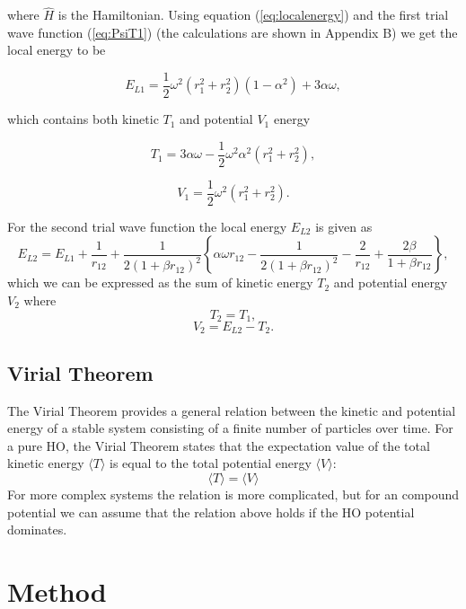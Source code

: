 \documentclass[norsk,a4paper,12pt]{article}
\begin{document}
where $\hat{H}$ is the Hamiltonian. Using equation (\ref{eq:localenergy}) and the first trial wave function (\ref{eq:PsiT1}) (the calculations are shown in Appendix B) we get the local energy to be

\begin{equation}
E_{L1} = \frac{1}{2}\omega^2 (r_1^2 + r_2^2)(1-\alpha^2) + 3\alpha \omega,
\label{eq:EL1}
\end{equation}

which contains both kinetic $T_1$ and potential $V_1$ energy

\begin{equation}
T_1 = 3\alpha \omega -\frac{1}{2}\omega^2\alpha^2\left(r_1^2 + r_2^2\right),
\label{eq:T_1}
\end{equation}

\begin{equation}
V_1 = \frac{1}{2}\omega^2(r_1^2 + r_2^2).
\end{equation}

For the second trial wave function the local energy $E_{L2}$\cite{Project_text} is given as
\begin{equation}
E_{L2} = E_{L1} + \frac{1}{r_{12}} + \frac{1}{2(1+\beta r_{12})^2}\left\{\alpha\omega r_{12}-\frac{1}{2(1+\beta r_{12})^2}-\frac{2}{r_{12}}+\frac{2\beta}{1+\beta r_{12}}\right\},
\label{eq:EL2}
\end{equation}
which we can be expressed as the sum of kinetic energy $T_2$ and potential energy $V_2$ where
$$T_2 = T_1,$$
$$V_2 = E_{L2} - T_2.$$
\subsection{Virial Theorem}
The Virial Theorem provides a general relation between the kinetic and potential energy of a stable system consisting of a finite number of particles over time. For  a pure HO, the Virial Theorem states that the expectation value of the total kinetic energy $\langle T\rangle$ is equal to the total potential energy $\langle V\rangle$:
\begin{equation}
\langle T\rangle=\langle V\rangle
\label{eq:virial}
\end{equation}
For more complex systems the relation is more complicated, but for an compound potential we can assume that the relation above holds if the HO potential dominates.


\section{Method} \label{Method}
\end{document}
